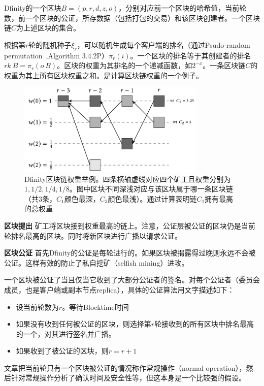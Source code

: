 Dfinity的一个区块$B=(p,r,d,z,o)$，分别对应前一个区块的哈希值，当前轮数，前一个区块的公证，所存数据（包括打包的交易）和该区块创建者。一个区块链$C$为上述区块的集合。

根据第$r$轮的随机种子$\xi_r$，可以随机生成每个客户端的排名（通过Psudo-random permutation~\cite{knuth1997art},Algorithm 3.4.2P）$\pi_r(i)$。一个区块的排名等于其创建者的排名$rk\ B=\pi_r(o\ B)$。区块的权重为其排名的一个递减函数，如$2^{-x}$。一条区块链$C$的权重为其上所有区块权重之和。是计算区块链权重的一个例子。

\begin{figure}
	\centering
	\includegraphics[width=0.8\textwidth]{../common/Dfinity_1.png}
	\caption{Dfinity区块链权重举例。四条横轴虚线对应四个矿工且权重分别为$1,1/2,1/4,1/8$。图中区块不同深浅对应与该区块属于哪一条区块链（共3条，$C_1$颜色最深，$C_3$颜色最浅）。通过计算表明链$C_1$拥有最高的总权重} 		
	\label{fig:Dfinity1}
\end{figure}
\textbf{区块提出}
矿工将区块接到权重最高的链上。注意，公证层被公证的区块仍是当前轮排名最高的区块。同时将新区块进行广播以请求公证。

\textbf{区块公证}
首先Dfinity的公证是每轮进行的。如果区块被揭露得过晚则永远不会被公证。这样有效的防止了私自挖矿（selfish mining）进攻。

一个区块被公证了当且仅当它收到了大部分公证者的签名。对每个公证者（委员会成员，也是客户端或副本节点replica），具体的公证算法用文字描述如下：
\begin{itemize}
	\item 设当前轮数为$r$。等待Blocktime时间
	\item 如果没有收到任何被公证的区块，则选择第$r$轮接收到的所有区块中排名最高的一个，对其进行签名并广播。
	\item 如果收到了被公证的区块，则$r=r+1$
\end{itemize}
文章把当前轮只有一个区块被公证的情况称作常规操作（normal operation），然后针对常规操作分析了确认时间及安全性等，但这本身是一个比较强的假设。

